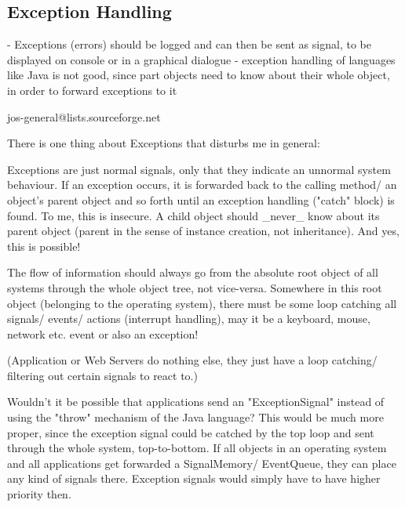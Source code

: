 %
%
%
%
%
%
%

\subsection{Exception Handling}
\label{exception_handling_heading}

- Exceptions (errors) should be logged and can then be sent as signal, to be
displayed on console or in a graphical dialogue
- exception handling of languages like Java is not good, since part objects
need to know about their whole object, in order to forward exceptions to it

jos-general@lists.sourceforge.net

There is one thing about Exceptions that disturbs me in general:

Exceptions are just normal signals, only that they indicate an unnormal
system behaviour. If an exception occurs, it is forwarded back to the
calling method/ an object's parent object and so forth until an exception
handling ("catch" block) is found. To me, this is insecure. A child object
should _never_ know about its parent object (parent in the sense of
instance creation, not inheritance). And yes, this is possible!

The flow of information should always go from the absolute root object
of all systems through the whole object tree, not vice-versa. Somewhere
in this root object (belonging to the operating system), there must be
some loop catching all signals/ events/ actions (interrupt handling),
may it be a keyboard, mouse, network etc. event or also an exception!

(Application or Web Servers do nothing else, they just have a loop
catching/ filtering out certain signals to react to.)

Wouldn't it be possible that applications send an "ExceptionSignal"
instead of using the "throw" mechanism of the Java language? This would
be much more proper, since the exception signal could be catched by
the top loop and sent through the whole system, top-to-bottom. If all
objects in an operating system and all applications get forwarded a
SignalMemory/ EventQueue, they can place any kind of signals there.
Exception signals would simply have to have higher priority then.

